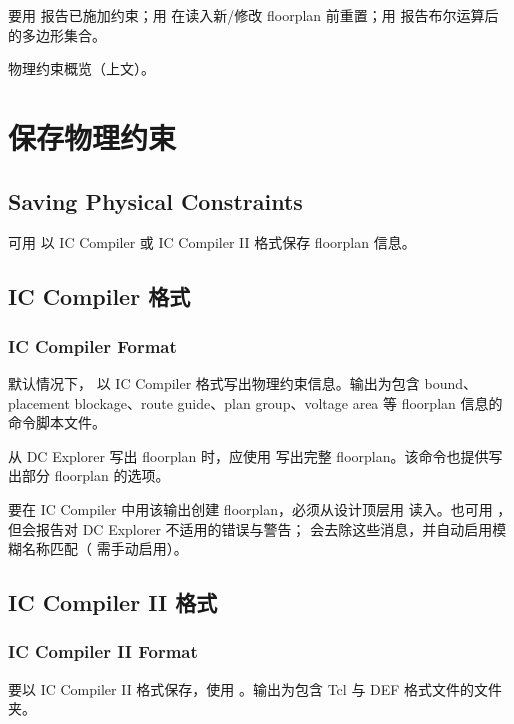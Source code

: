 要用  报告已施加约束；用  在读入新/修改 floorplan 前重置；用  报告布尔运算后的多边形集合。

\begin{seeAlsoBox}
物理约束概览（上文）。
\end{seeAlsoBox}

\section{保存物理约束}
\subsection*{Saving Physical Constraints}

可用  以 IC Compiler 或 IC Compiler II 格式保存 floorplan 信息。

\subsection{IC Compiler 格式}
\subsubsection*{IC Compiler Format}

默认情况下， 以 IC Compiler 格式写出物理约束信息。输出为包含 bound、placement blockage、route guide、plan group、voltage area 等 floorplan 信息的命令脚本文件。

从 DC Explorer 写出 floorplan 时，应使用  写出完整 floorplan。该命令也提供写出部分 floorplan 的选项。

要在 IC Compiler 中用该输出创建 floorplan，必须从设计顶层用  读入。也可用 ，但会报告对 DC Explorer 不适用的错误与警告； 会去除这些消息，并自动启用模糊名称匹配（ 需手动启用）。

\subsection{IC Compiler II 格式}
\subsubsection*{IC Compiler II Format}

要以 IC Compiler II 格式保存，使用 。输出为包含 Tcl 与 DEF 格式文件的文件夹。

